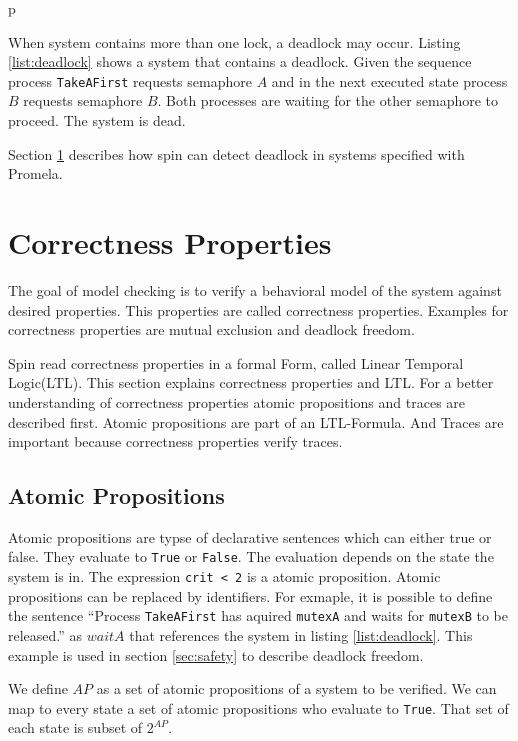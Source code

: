 p\documentclass[a4paper, twoside]{article}
\begin{document}
When system contains more than one lock, a deadlock may occur. Listing \ref{list:deadlock} shows a system that contains a deadlock. Given the sequence process \verb|TakeAFirst| requests semaphore $A$ and in the next executed state process $B$ requests semaphore $B$. Both processes are waiting for the other semaphore to proceed. The system is dead.

Section \ref{sec:ltl} describes how spin can detect deadlock in systems specified with Promela.



\section{Correctness Properties}
\label{sec:ltl}

The goal of model checking is to verify a behavioral model of the system against desired properties. This properties are called correctness properties. Examples for correctness properties are mutual exclusion and deadlock freedom. 

Spin read correctness properties in a formal Form, called Linear Temporal Logic(LTL). This section explains correctness properties and LTL. For a better understanding of correctness properties atomic propositions and traces are described first. Atomic propositions are part of an LTL-Formula. And Traces are important because correctness properties verify traces.

\subsection{Atomic Propositions}
\label{sec:atomicpropositions}

Atomic propositions are typse of declarative sentences which can either true or false. They evaluate to \verb|True| or \verb|False|. The evaluation depends on the state the system is in. The expression \verb|crit < 2| is a atomic proposition. Atomic propositions can be replaced by identifiers. For exmaple, it is possible to define the sentence ``Process \verb|TakeAFirst| has aquired \verb|mutexA| and waits for \verb|mutexB| to be released.'' as $waitA$  that references the system in listing \ref{list:deadlock}. This example is used in section \ref{sec:safety} to describe deadlock freedom.
 
We define $AP$ as a set of atomic propositions of a system to be verified. We can map to every state a set of atomic propositions who evaluate to \verb|True|. That set of each state is subset of $2^{AP}$.
\end{document}
